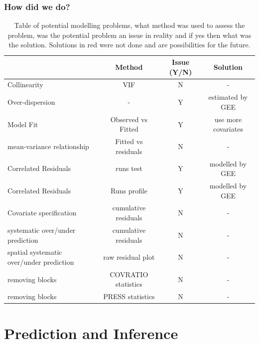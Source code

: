 \documentclass[11pt, a4paper]{article}
\begin{document}
\begin{frame}
\frametitle{How did we do?}
\begin{table}[h]
\centering
\scriptsize
\caption{Table of potential modelling problems, what method was used to assess the problem, was the potential problem an issue in reality and if yes then what was the solution.  Solutions in red were not done and are possibilities for the future.}
\begin{tabular}{l|c|c|c}
\textbf{} & \textbf{Method} & \textbf{Issue (Y/N)} & \textbf{Solution}\\
\hline
Collinearity & VIF & N & -\\
Over-dispersion& - & Y & estimated by GEE\\
Model Fit & Observed vs Fitted & Y & {\color{red} use more covariates}\\
mean-variance relationship & Fitted vs residuals & N & -\\
Correlated Residuals & runs test & Y & modelled by GEE\\
Correlated Residuals & Runs profile & Y & modelled by GEE\\
Covariate specification & cumulative residuals & N & -\\
systematic over/under prediction & cumulative residuals & N & -\\
spatial systematic over/under prediction & raw residual plot & N & -\\
removing blocks & COVRATIO statistics & N & - \\
removing blocks & PRESS statistics & N & - \\

\end{tabular}
\label{tab:fitstats}
\end{table}

\end{frame}

\section{Prediction and Inference}
\end{document}
